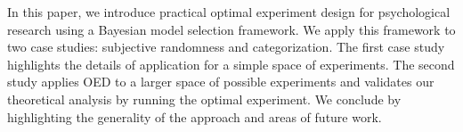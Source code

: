 \documentclass{article}
\begin{document}
In this paper, we introduce practical optimal experiment design for psychological research using a Bayesian model selection framework. 
We apply this framework to two case studies: subjective randomness and categorization.
The first case study highlights the details of application for a simple space of experiments.
The second study applies OED to a larger space of possible experiments and validates our theoretical analysis by running the optimal experiment.
We conclude by highlighting the generality of the approach and areas of future work.


\end{document}
